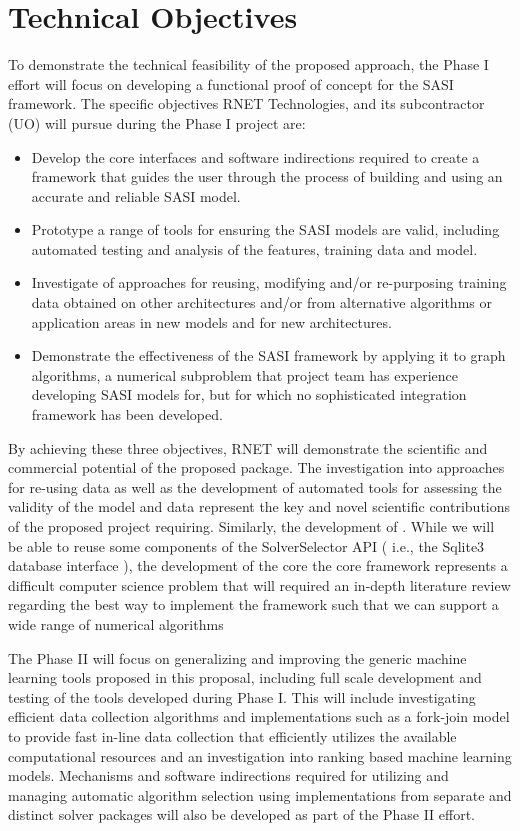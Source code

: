 \section{Technical Objectives}
 
To demonstrate the technical feasibility of the proposed approach, the Phase I effort will focus on developing a functional proof of concept for the 
SASI framework. The specific objectives RNET Technologies, and its subcontractor (UO) will pursue during the Phase I project are:

\begin{itemize}
  \item Develop the core interfaces and software indirections required to create a framework that 
  guides the user through the process of building and using an accurate and reliable SASI model.
  \item Prototype a range of tools for ensuring the SASI models are valid, including automated testing and analysis of the features, training data and model. 
  \item Investigate of approaches for reusing, modifying and/or re-purposing training data obtained on other architectures and/or from alternative algorithms or application areas in new models and for new architectures. 
  \item Demonstrate the effectiveness of the SASI framework by applying it to graph algorithms, a numerical subproblem that
  project team has experience developing SASI models for, but for which no sophisticated integration framework has been developed. 
\end{itemize}

By achieving these three objectives, RNET will demonstrate the scientific and commercial potential of the proposed package. The investigation into approaches for re-using data as well as the development of automated tools for assessing the validity of the model and data represent the key and novel scientific contributions of the proposed project requiring. Similarly, the development of . While we will be able to reuse some components of the SolverSelector API ( i.e., the Sqlite3 database interface ), the development of the core the core framework represents a difficult computer science problem that will required an in-depth literature review regarding the best way to implement the framework such that we can support a wide range of numerical algorithms

The Phase II will focus on generalizing and improving the generic machine learning tools proposed in this proposal, including full scale development and testing of the tools developed during Phase I.  This will include investigating efficient data collection algorithms and implementations such as a fork-join model to provide fast in-line data collection that efficiently utilizes the available computational resources and an investigation into ranking based machine learning models. Mechanisms and software indirections required for utilizing and managing automatic algorithm selection using implementations from separate and distinct solver packages will also be developed as part of the Phase II effort. 
